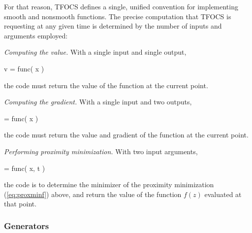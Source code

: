 \documentclass{article}
\begin{document}
For that reason, TFOCS defines a 
single, unified convention for implementing smooth and
nonsmooth functions. 
The precise computation that TFOCS is requesting at any given time is
determined by the number of inputs and arguments employed:
\begin{trivlist}
\item \emph{Computing the value.} With a single input and single output,
\begin{code}
	v = func( x )
\end{code}
the code must return the value of the function at the current point.
\item \emph{Computing the gradient.} With a single input and two outputs, 
\begin{code}
	[ v, grad ] = func( x )
\end{code}
the code must return the value and gradient of the function at the
current point.
\item \emph{Performing proximity minimization.} With two input
arguments,
\begin{code}
	[ vz, z ] = func( x, t )
\end{code}
the code is to determine the minimizer \verb@z@ of the proximity 
minimization (\ref{eq:proxminf}) above, and return the value of the
function $f(z)$ evaluated at that point.
\end{trivlist}

\subsubsection{Generators}
\label{sec:smoothg}
\end{document}
